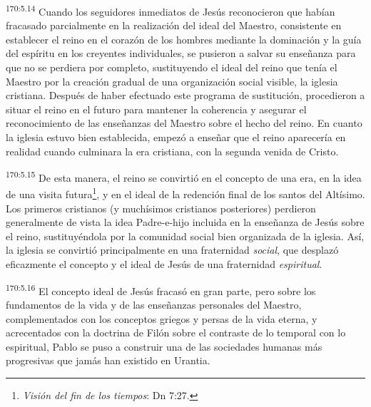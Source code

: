 \par
\textsuperscript{170:5.14} Cuando los seguidores inmediatos de Jesús reconocieron que habían fracasado parcialmente en la realización del ideal del Maestro, consistente en establecer el reino en el corazón de los hombres mediante la dominación y la guía del espíritu en los creyentes individuales, se pusieron a salvar su enseñanza para que no se perdiera por completo, sustituyendo el ideal del reino que tenía el Maestro por la creación gradual de una organización social visible, la iglesia cristiana. Después de haber efectuado este programa de sustitución, procedieron a situar el reino en el futuro para mantener la coherencia y asegurar el reconocimiento de las enseñanzas del Maestro sobre el hecho del reino. En cuanto la iglesia estuvo bien establecida, empezó a enseñar que el reino aparecería en realidad cuando culminara la era cristiana, con la segunda venida de Cristo.

\par
\textsuperscript{170:5.15} De esta manera, el reino se convirtió en el concepto de una era, en la idea de una visita futura\footnote{\textit{Visión del fin de los tiempos}: Dn 7:27.}, y en el ideal de la redención final de los santos del Altísimo. Los primeros cristianos (y muchísimos cristianos posteriores) perdieron generalmente de vista la idea Padre-e-hijo incluida en la enseñanza de Jesús sobre el reino, sustituyéndola por la comunidad social bien organizada de la iglesia. Así, la iglesia se convirtió principalmente en una fraternidad \textit{social}, que desplazó eficazmente el concepto y el ideal de Jesús de una fraternidad \textit{espiritual}.

\par
\textsuperscript{170:5.16} El concepto ideal de Jesús fracasó en gran parte, pero sobre los fundamentos de la vida y de las enseñanzas personales del Maestro, complementados con los conceptos griegos y persas de la vida eterna, y acrecentados con la doctrina de Filón sobre el contraste de lo temporal con lo espiritual, Pablo se puso a construir una de las sociedades humanas más progresivas que jamás han existido en Urantia.

